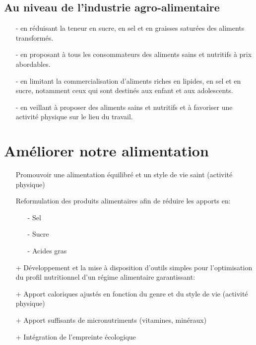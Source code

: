 \documentclass[11pt]{article}
\begin{document}
\subsection{Au niveau de l'industrie agro-alimentaire}
\begin{itemize}
    \item[-] en réduisant la teneur en sucre, en sel et en graisses saturées des aliments transformés.
    \item[-] en proposant à tous les consommateurs des aliments sains et nutritifs à prix abordables.
    \item[-] en limitant la commercialisation d'aliments riches en lipides, en sel et en sucre, notamment ceux qui sont destinés aux enfant et aux adolescents.
    \item[-] en veillant à proposer des aliments sains et nutritifs et à favoriser une activité physique sur le lieu du travail.
\end{itemize}

\section{Améliorer notre alimentation}
\begin{itemize}
    \item[] Promouvoir une alimentation équilibré et un style de vie saint (activité physique)
    \item[] Reformulation des produits alimentaires afin de réduire les apports en:
    \begin{itemize}
        \item[-] Sel
        \item[-] Sucre
        \item[-] Acides gras
\end{itemize}
    \item[+] Développement et la mise à disposition d'outils simples pour l'optimisation du profil nutritionnel d'un régime alimentaire garantissant:
    \item[+] Apport caloriques ajustés en fonction du genre et du style de vie (activité physique)
    \item[+] Apport suffisants de micronutriments (vitamines, minéraux)
    \item[+] Intégration de l'empreinte écologique

    \end{itemize}   
\end{document}
